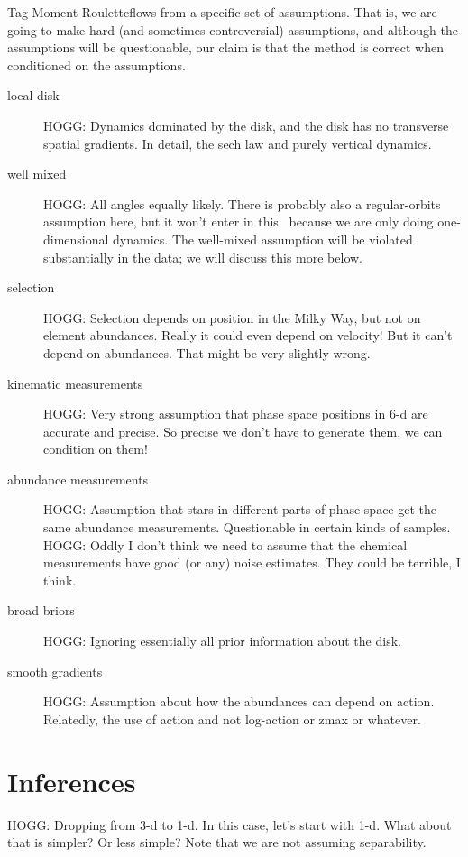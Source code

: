 \documentclass[modern]{aastex63}
\newcommand{\methodname}{Tag Moment Roulette}
\begin{document}
\methodname flows from a specific set of assumptions.
That is, we are going to make hard (and sometimes controversial) assumptions,
and although the assumptions will be questionable, our claim is that the
method is correct when conditioned on the assumptions.
\begin{description}
\item[local disk] HOGG: Dynamics dominated by the disk,
and the disk has no transverse spatial gradients. In detail, the sech law and purely
vertical dynamics.

\item[well mixed] HOGG: All angles equally likely. There is probably also a regular-orbits
assumption here, but it won't enter in this \documentname\ because we are only doing
one-dimensional dynamics. The well-mixed assumption will be violated substantially in the data;
we will discuss this more below.

\item[selection] HOGG: Selection depends on position in the Milky Way, but not
on element abundances. Really it could even depend on velocity! But it can't depend
on abundances. That might be very slightly wrong.

\item[kinematic measurements] HOGG: Very strong assumption that phase space positions
in 6-d are accurate and precise. So precise we don't have to generate them, we can
condition on them!

\item[abundance measurements] HOGG: Assumption that stars in different parts of phase
space get the same abundance measurements. Questionable in certain kinds of samples.
HOGG: Oddly I don't think we need to assume that the chemical measurements have good
(or any) noise estimates. They could be terrible, I think.

\item[broad briors] HOGG: Ignoring essentially all prior information about the disk.

\item[smooth gradients] HOGG: Assumption about how the abundances can depend on action.
Relatedly, the use of action and not log-action or zmax or whatever.
\end{description}

\section{Inferences}

HOGG: Dropping from 3-d to 1-d. In this case, let's start with 1-d. What about that is simpler? Or less simple? Note that we are not assuming separability.
\end{document}
